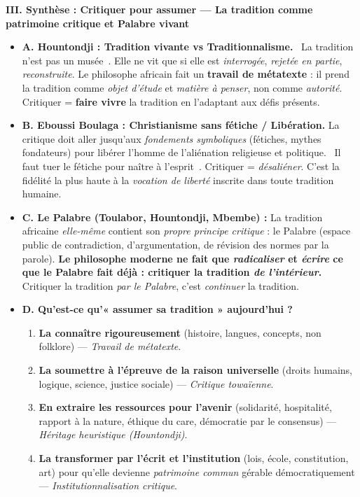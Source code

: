 \documentclass[11pt]{article}
\newcommand{\cle}[1]{{\popxbold\color{popdark}#1}}
\begin{document}
\begin{corrige}
\textbf{III. Synthèse : Critiquer pour assumer — La tradition comme \cle{patrimoine critique} et \cle{Palabre} vivant}
\begin{itemize}
\item \textbf{A. Hountondji : \cle{Tradition vivante} vs \cle{Traditionnalisme}.} \guillemotleft~La tradition n'est pas un musée~\guillemotright. Elle ne vit que si elle est \emph{interrogée}, \emph{rejetée en partie}, \emph{reconstruite}. Le philosophe africain fait un \textbf{travail de métatexte} : il prend la tradition comme \emph{objet d'étude} et \emph{matière à penser}, non comme \emph{autorité}. Critiquer = \textbf{faire vivre} la tradition en l'adaptant aux défis présents.
\item \textbf{B. Eboussi Boulaga : \cle{Christianisme sans fétiche} / \cle{Libération}.} La critique doit aller jusqu'aux \emph{fondements symboliques} (fétiches, mythes fondateurs) pour libérer l'homme de l'aliénation religieuse et politique. \guillemotleft~Il faut tuer le fétiche pour naître à l'esprit~\guillemotright. Critiquer = \emph{désaliéner}. C'est la fidélité la plus haute à la \emph{vocation de liberté} inscrite dans toute tradition humaine.
\item \textbf{C. Le \cle{Palabre} (Toulabor, Hountondji, Mbembe) :} La tradition africaine \emph{elle-même} contient son \emph{propre principe critique} : le Palabre (espace public de contradiction, d'argumentation, de révision des normes par la parole). \textbf{Le philosophe moderne ne fait que \emph{radicaliser} et \emph{écrire} ce que le Palabre fait déjà : critiquer la tradition \emph{de l'intérieur}.} Critiquer la tradition \emph{par le Palabre}, c'est \emph{continuer} la tradition.
\item \textbf{D. Qu'est-ce qu'« assumer sa tradition » aujourd'hui ?}
\begin{enumerate}
\item \textbf{La connaître rigoureusement} (histoire, langues, concepts, non folklore) — \emph{Travail de métatexte}.
\item \textbf{La soumettre à l'épreuve de la raison universelle} (droits humains, logique, science, justice sociale) — \emph{Critique towaïenne}.
\item \textbf{En extraire les ressources pour l'avenir} (solidarité, hospitalité, rapport à la nature, éthique du care, démocratie par le consensus) — \emph{Héritage heuristique (Hountondji)}.
\item \textbf{La transformer par l'écrit et l'institution} (lois, école, constitution, art) pour qu'elle devienne \emph{patrimoine commun} gérable démocratiquement — \emph{Institutionnalisation critique}.
\end{enumerate}
\end{itemize}


\end{corrige}
\end{document}
